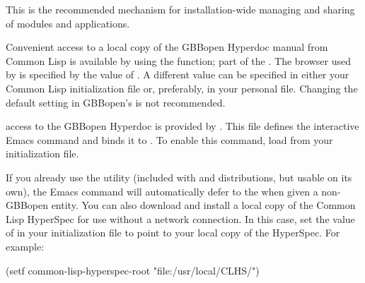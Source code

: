 \documentclass[10pt,twoside,english,pdftex]{article}
\begin{document}
This is the recommended mechanism for installation-wide managing and sharing
of modules and applications.

\label{sec:hyperdoc}
%
%
%
%
%
%
%
%
%
%
%

Convenient access to a local copy of the GBBopen Hyperdoc manual from Common
Lisp is available by using the 
function; part of the 
. The browser used by 
is specified by the value of .  A
different value can be specified in either your Common Lisp initialization
file or, preferably, in your personal  file.
Changing the default setting in GBBopen's  is not
recommended.

 access to the
GBBopen Hyperdoc is provided by
.  This file
defines the interactive Emacs command  and
binds it to .  To enable this command, load
 from your
 initialization file.

If you already use the
utility (included with
 and
 distributions, but
usable on its own), the Emacs  command will
automatically defer to the  when given a
non-GBBopen entity.  You can also download and install a local copy of the
Common Lisp HyperSpec for use without a network connection.  In this case, set
the value of  in your 
initialization file to point to your local copy of the HyperSpec.  For
example:
%
\W\supp
\begin{example}
  (setf common-lisp-hyperspec-root "file:/usr/local/CLHS/")
\end{example}
\end{document}
